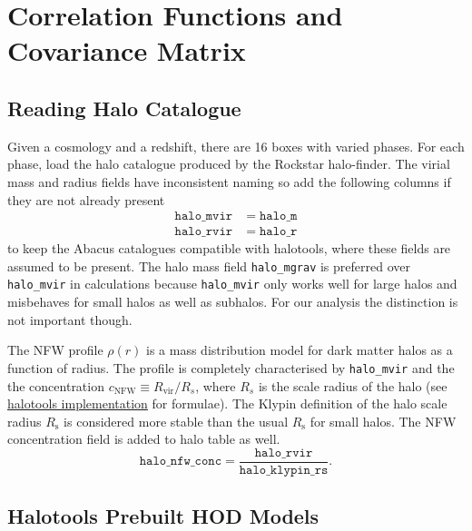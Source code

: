 \documentclass[10pt,A4]{aastex62}
\begin{document}
\section{Correlation Functions and Covariance Matrix}

	\subsection{Reading Halo Catalogue}
		
		Given a cosmology and a redshift, there are 16 boxes with varied phases. For each phase, load the halo catalogue produced by the Rockstar halo-finder. The virial mass and radius fields have inconsistent naming so add the following columns if they are not already present
		\begin{align}
			\mathtt{halo\_mvir} & = \mathtt{halo\_m} \\
			\mathtt{halo\_rvir} & = \mathtt{halo\_r}
		\end{align}
		to keep the Abacus catalogues compatible with halotools, where these fields are assumed to be present. The halo mass field \texttt{halo\_mgrav} is preferred over \texttt{halo\_mvir} in calculations because \texttt{halo\_mvir} only works well for large halos and misbehaves for small halos as well as subhalos. For our analysis the distinction is not important though. 
		
		The NFW profile $\rho(r)$ is a mass distribution model for dark matter halos as a function of radius. The profile is completely characterised by \texttt{halo\_mvir} and the the concentration $c_\text{NFW} \equiv R_\text{vir}/{R_s}$, where $R_s$ is the scale radius of the halo (see \href{http://halotools.readthedocs.io/en/latest/source_notes/empirical_models/phase_space_models/nfw_profile_source_notes.html#nfw-profile-tutorial}{halotools implementation} for formulae). The Klypin definition of the halo scale radius $R_\text{s}$ is considered more stable than the usual $R_\text{s}$ for small halos. The NFW concentration field is added to halo table as well.
		\begin{equation}
			\mathtt{halo\_nfw\_conc} = \frac{\mathtt{halo\_rvir}}{\mathtt{halo\_klypin\_rs}}.
		\end{equation}
		
	\subsection{Halotools Prebuilt HOD Models}
		
\end{document}
